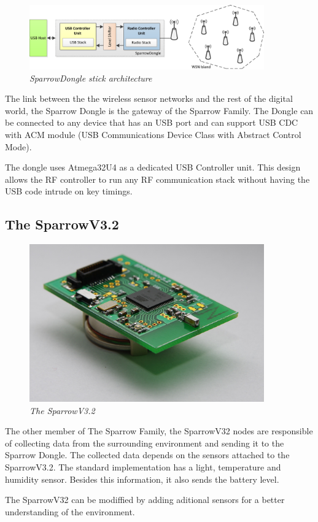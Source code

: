 \begin{figure}[ht]
\begin{center}
\includegraphics[width=0.9\textwidth]{hw_platform/donge_architecture.png}
\end{center}
\caption{\small \itshape{SparrowDongle stick architecture}}
\end{figure}

The link between the the wireless sensor networks and the rest of the digital world, the Sparrow Dongle is the gateway of the Sparrow Family. The Dongle can be connected to any device that has an USB port and can support USB CDC with ACM module (USB Communications Device Class with Abstract Control Mode). 

The dongle uses Atmega32U4 as a dedicated USB Controller unit. This design allows the RF controller to run any RF communication stack without having the USB code intrude on key timings.\cite{voinescu2013lightweight}


\subsection{The SparrowV3.2}

\begin{figure}[ht]
\begin{center}
\includegraphics[width=0.9\textwidth]{hw_platform/Sparrowv32.jpg}
\end{center}
\caption{\small \itshape{The SparrowV3.2}}
\end{figure}

The other member of The Sparrow Family, the SparrowV32 nodes are responsible of collecting data from the surrounding environment and sending it to the Sparrow Dongle. The collected data depends on the sensors attached to the SparrowV3.2. The standard implementation has a light, temperature and humidity sensor. Besides this information, it also sends the battery level.

The SparrowV32 can be modiffied by adding aditional sensors for a better understanding of the environment.
